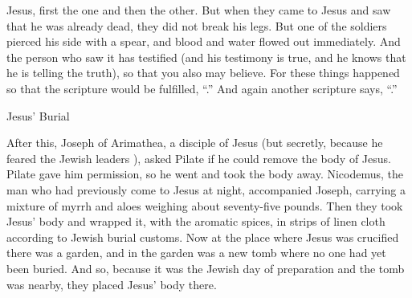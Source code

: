 {Jesus,
first
the one and
then the other.
But
when
they came
to Jesus
and saw
that he
was
already
dead,
they did
not
break
his
legs.
But
one
of the soldiers
pierced
his
side
with a spear,
and
blood
and
water
flowed out
immediately.
And
the person who saw
it has testified
(and
his
testimony
is
true,
and
he
knows
that
he is telling
the truth), so that
you
also
may believe.
For
these things
happened
so that
the scripture
would be fulfilled, “{}.”
And
again
another
scripture
says, “{}.”
\par }{\SH Jesus’ Burial
\par }{\PP {}After
this,
Joseph
of
Arimathea,
a disciple
of Jesus
(but
secretly,
because
he feared
the
Jewish
leaders ), asked
Pilate
if he could remove
the body
of Jesus.
Pilate
gave
him permission,
so
he went
and
took
the
body
away.
Nicodemus,
the man who had previously
come
to
Jesus
at night,
accompanied Joseph, carrying
a mixture
of myrrh
and
aloes
weighing about
seventy-five
pounds.
Then
they took
Jesus’
body
and
wrapped
it,
with
the aromatic spices,
in strips of linen cloth
according to
Jewish
burial
customs.
Now
at
the place
where
Jesus was crucified
there was
a garden,
and
in
the garden
was
a new
tomb
where
no one
had
yet
been buried.
And so,
because
it was the Jewish
day of preparation
and the tomb
was
nearby,
they placed
Jesus’ body there.

}
